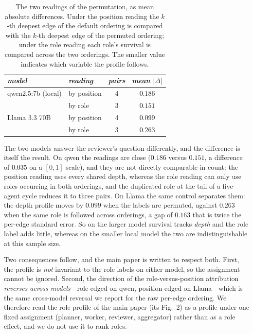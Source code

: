 \documentclass[sigconf,anonymous]{aamas}
\begin{document}
\begin{table}[h]
\scriptsize
\centering
\caption{The two readings of the permutation, as mean absolute differences. Under
the position reading the $k$-th deepest edge of the default ordering is compared with
the $k$-th deepest edge of the permuted ordering; under the role reading each role's
survival is compared across the two orderings. The smaller value indicates which
variable the profile follows.}
\vspace{4pt}
\label{tab:role-perm-readings}
\begin{tabular}{llcc}
\toprule
\textit{model} & \textit{reading} & \textit{pairs} & \textit{mean $|\Delta|$} \\
\midrule
qwen2.5:7b (local) & by position & 4 & $0.186$ \\
                   & by role     & 3 & $0.151$ \\
\midrule
Llama 3.3 70B      & by position & 4 & $\mathbf{0.099}$ \\
                   & by role     & 3 & $0.263$ \\
\bottomrule
\end{tabular}
\end{table}

The two models answer the reviewer's question differently, and the difference is itself
the result. On qwen the readings are close ($0.186$ versus $0.151$, a difference of
$0.035$ on a $[0,1]$ scale), and they are not directly comparable in count: the position
reading uses every shared depth, whereas the role reading can only use roles occurring in
both orderings, and the duplicated role at the tail of a five-agent cycle reduces it to
three pairs. On Llama the same control separates them: the depth profile moves by
$0.099$ when the labels are permuted, against $0.263$ when the same role is followed
across orderings, a gap of $0.163$ that is twice the per-edge standard error. So on the
larger model survival tracks \emph{depth} and the role label adds little, whereas on the
smaller local model the two are indistinguishable at this sample size.

Two consequences follow, and the main paper is written to respect both. First, the
profile is \emph{not} invariant to the role labels on either model, so the assignment
cannot be ignored. Second, the direction of the role-versus-position attribution
\emph{reverses across models}---role-edged on qwen, position-edged on Llama---which is
the same cross-model reversal we report for the raw per-edge ordering. We therefore read
the role profile of the main paper (its Fig.~2) as a profile under one fixed assignment
(planner, worker, reviewer, aggregator) rather than as a role effect, and we do not use
it to rank roles.
\end{document}
